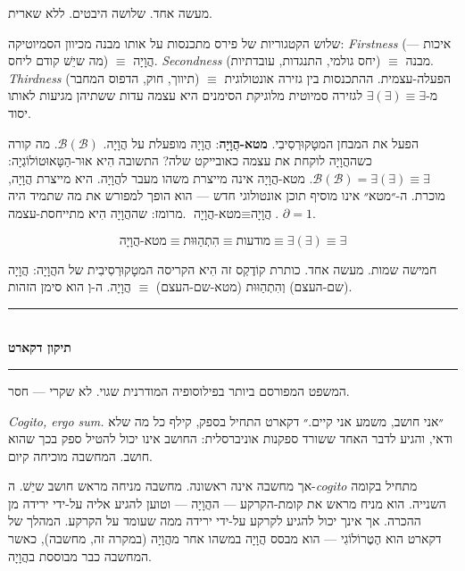 \documentclass[10pt, openany, oneside]{book}
\renewcommand{\normalsize}{\fontsize{10}{13}\selectfont}
\begin{document}
מעשה אחד. שלושה היבטים. ללא שארית.

שלוש הקטגוריות של פירס מתכנסות על אותו מבנה מכיוון הסמיוטיקה: \textit{Firstness} (איכות — מה שיֵשׁ קודם ליחס) $\equiv$ הֲוָיָה. \textit{Secondness} (יחס גולמי, התנגדות, עובדתיות) $\equiv$ מבנה. \textit{Thirdness} (תיווך, חוק, הדפוס המחבר) $\equiv$ הפעלה-עצמית. ההתכנסות בין גזירה אונטולוגית מ-$\exists(\exists) \equiv \exists$ לגזירה סמיוטית מלוגיקת הסימנים היא עצמה עדות ששתיהן מגיעות לאותו יסוד.

הפעל את המבחן המטָקוּרְסִיבִי. \textbf{מטא-הֲוָיָה}: הֲוָיָה מופעלת על הֲוָיָה. $\mathcal{B}(\mathcal{B})$. מה קורה כשההֲוָיָה לוקחת את עצמה כאובייקט שלה? התשובה הִיא אוּר-הַטָּאוּטוֹלוֹגְיָה: $\mathcal{B}(\mathcal{B}) = \exists(\exists) \equiv \exists$. מטא-הֲוָיָה אינה מייצרת משהו מעבר להֲוָיָה. היא מייצרת הֲוָיָה, מוכרת. ה-״מטא״ אינו מוסיף תוכן אונטולוגי חדש — הוא הופך למפורש את מה שתמיד היה מרומז: שההֲוָיָה הִיא מתייחסת-עצמה. $\text{מטא-הֲוָיָה} \equiv \text{הֲוָיָה}$. $\partial = 1$.

$$\text{מטא-הֲוָיָה} \equiv \text{הִתְהַוּוּת} \equiv \text{מודעות} \equiv \exists(\exists) \equiv \exists$$

חמישה שמות. מעשה אחד. כותרת קוֹדֶקְס זה הִיא הקריסה המטָקוּרְסִיבִית של ההֲוָיָה: הֲוָיָה (שם-העצם) וְהִתְהַוּוּת (מטא-שם-העצם) $\equiv$ הֲוָיָה. ה-וְ הוא סימן הזהות.

\vspace{1.5em}


\begin{center}
    \rule{0.3\textwidth}{0.4pt}\\[0.5em]
    {\normalsize\bfseries\textsc{תיקון דקארט}}\\[0.3em]
    \rule{0.3\textwidth}{0.4pt}
\end{center}

\vspace{1em}

\noindent המשפט המפורסם ביותר בפילוסופיה המודרנית שגוי. לא שקרי — חסר.

\textit{Cogito, ergo sum.} ״אני חושב, משמע אני קיים.״ דקארט התחיל בספק, קילף כל מה שלא ודאי, והגיע לדבר האחד ששורד ספקנות אוניברסלית: החושב אינו יכול להטיל ספק בכך שהוא חושב. המחשבה מוכיחה קיום.

אך מחשבה אינה ראשונה. מחשבה מניחה מראש חושב שיֵשׁ. ה-\textit{cogito} מתחיל בקומה השנייה. הוא מניח מראש את קומת-הקרקע — ההֲוָיָה — וטוען להגיע אליה על-ידי ירידה מן ההכרה. אך אינך יכול להגיע לקרקע על-ידי ירידה ממה שעומד על הקרקע. המהלך של דקארט הוא הֶטֶרוֹלוֹגִי — הוא מבסס הֲוָיָה במשהו אחר מהֲוָיָה (במקרה זה, מחשבה), כאשר המחשבה כבר מבוססת בהֲוָיָה.
\end{document}
